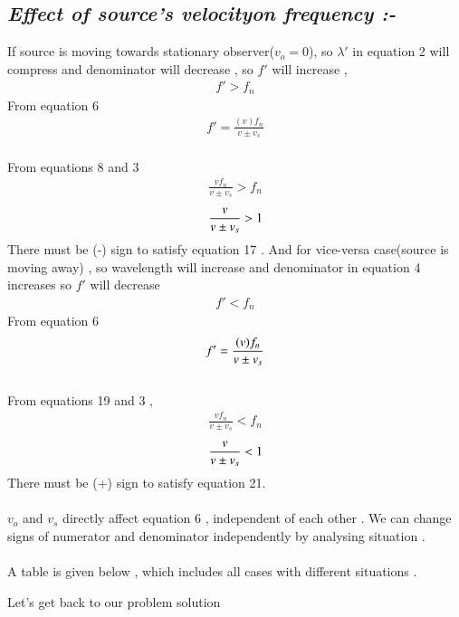\documentclass[journal,12pt,twocolumn]{IEEEtran}
\theoremstyle{remark}
\begin{document}
\subsection*{\textit{Effect \;of  \;source's  \;velocity\;on \;frequency :-}}
If source is moving towards stationary observer($v_o =0$), so $\lambda'$ in equation 2 will compress and denominator will decrease , so $f'$ will increase , \begin{align}f'>f_n\end{align}From equation  6
\begin{align}f' = \frac{(v)f_n}{v \pm v_s}\end{align}\\
From equations  8 and 3
\begin{align} \frac{v f_n}{v \pm v_s} > f_n\end{align}
\begin{align}{\label{eq17}} \frac{v}{v \pm v_s} > 1\end{align}
 There must be (-) sign to satisfy equation  17 .
And for vice-versa case(source is moving away) , so wavelength will increase and denominator in equation 4 increases so $f'$ will decrease \\
\begin{align}f'<f_n\end{align}
From equation 6
\begin{align}{\label{eq19}} f' = \frac{(v)f_n}{v \pm v_s}\end{align}\\
From equations 19 and 3 , 
\begin{align} \frac{v f_n}{v \pm v_s} < f_n\end{align}
\begin{align}{\label{eq21}} \frac{v}{v \pm v_s} < 1\end{align}
 There must be (+) sign to satisfy equation 21.\\\\
 $v_o$ and $v_s$ directly affect equation 6 , independent of each other . We can change signs of numerator and denominator independently by analysing situation .\\\\
A table is given below , which includes all cases with different situations .
    \begin{table}[h]
   
        
       
    \end{table}
    \newpage
Let's get back to our problem solution\\
\end{document}
